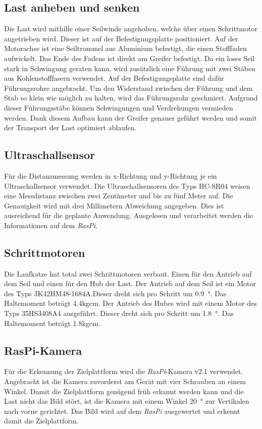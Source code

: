 \documentclass[a4paper]{report}
\begin{document}
\subsection{Last anheben und senken}
Die Last wird mithilfe einer Seilwinde angehoben, welche über einen Schrittmotor angetrieben wird. Dieser ist auf der Befestigungsplatte positioniert. Auf der Motorachse ist eine Seiltrommel aus Aluminium befestigt, die einen Stofffaden aufwickelt. Das Ende des Fadens ist direkt am Greifer befestigt. %
Da ein loses Seil stark in Schwingung geraten kann, wird zusätzlich eine Führung mit zwei Stäben aus Kohlenstofffasern verwendet. Auf der Befestigungsplatte sind dafür Führungsrohre angebracht. Um den Widerstand zwischen der Führung und dem Stab so klein wie möglich zu halten, wird das Führungsrohr geschmiert. Aufgrund dieser Führungsstäbe können Schwingungen und Verdrehungen vermieden werden. 
Dank diesem Aufbau kann der Greifer genauer geführt werden und somit der Transport der Last optimiert ablaufen.

\subsection{Ultraschallsensor}
Für die Distanzmessung werden in x-Richtung und y-Richtung je ein Ultraschallsensor verwendet. Die Ultraschallsensoren des Typs HC-SR04 weisen eine Messdistanz zwischen zwei Zentimeter und bis zu fünf Meter auf. Die Genauigkeit wird mit drei Millimetern Abweichung angegeben. Dies ist ausreichend für die geplante Anwendung. Ausgelesen und verarbeitet werden die Informationen auf dem \textit{RasPi}.

\subsection{Schrittmotoren}
Die Laufkatze hat total zwei Schrittmotoren verbaut. Einen für den Antrieb auf dem Seil und einen für den Hub der Last. Der Antrieb auf dem Seil ist ein Motor des Typs JK42HM48-1684A.Dieser dreht sich pro Schritt um \SI{0.9}{\degree}. Das Haltemoment beträgt 4.4kgcm. Der Antrieb des Hubes wird mit einem Motor des Typs 35HS3408A4 ausgeführt. Dieser dreht sich pro Schritt um \SI{1.8}{\degree}. Das Haltemoment beträgt 1.8kgcm.


\subsection{RasPi-Kamera}
Für die Erkennung der Zielplattform wird die \textit{RasPi}-Kamera v2.1 verwendet. Angebracht ist die Kamera zuvorderst am Gerät mit vier Schrauben an einem Winkel. Damit die Zielplattform genügend früh erkannt werden kann und die Last nicht das Bild stört, ist die Kamera mit einem Winkel \SI{20}{\degree} zur Vertikalen nach vorne gerichtet. Das Bild wird auf dem \textit{RasPi} ausgewertet und erkennt damit die Zielplattform.
\end{document}
